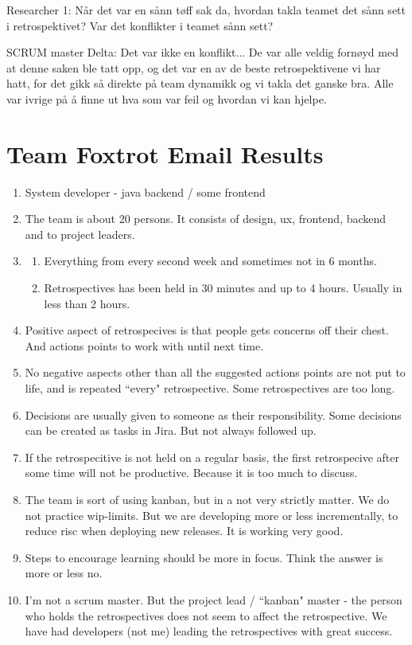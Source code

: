 Researcher 1: Når det var en sånn tøff sak da, hvordan takla teamet det sånn sett i retrospektivet? Var det konflikter i teamet sånn sett?

SCRUM master Delta: Det var ikke en konflikt... De var alle veldig fornøyd med at denne saken ble tatt opp, og det var en av de beste retrospektivene vi har hatt, for det gikk så direkte på team dynamikk og vi takla det ganske bra. Alle var ivrige på å finne ut hva som var feil og hvordan vi kan hjelpe.


\chapter{Team Foxtrot Email Results}
\begin{enumerate}
\item System developer - java backend / some frontend
\item The team is about 20 persons. It consists of design, ux, frontend, backend and to project leaders.
\item \begin{enumerate}
	\item Everything from every second week and sometimes not in 6 months.
	\item Retrospectives has been held in 30 minutes and up to 4 hours. Usually in less than 2 hours.
	\end{enumerate}
\item Positive aspect of retrospecives is that people gets concerns off their chest. And actions points to work with until next time.
\item No negative aspects other than all the suggested actions points are not put to life, and is repeated ``every" retrospective. Some retrospectives are too long.
\item Decisions are usually given to someone as their responsibility. Some decisions can be created as tasks in Jira. But not always followed up. 
\item If the retrospecitive is not held on a regular basis, the first retrospecive after some time will not be productive. Because it is too much to discuss.
\item The team is sort of using kanban, but in a not very strictly matter. We do not practice wip-limits. But we are developing more or less incrementally, to reduce risc when deploying new releases. It is working very good.
\item Steps to encourage learning should be more in focus. Think the answer is more or less no.
\item I'm not a scrum master. But the project lead / ``kanban" master - the person who holds the retrospectives does not seem to affect the retrospective. We have had developers (not me) leading the retrospectives with great success.

\end{enumerate}
